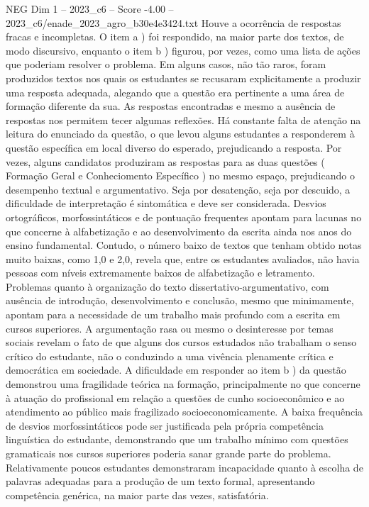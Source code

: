 \begin{textsample}{NEG Dim 1 – 2023\_c6 – Score -4.00 – 2023\_c6/enade\_2023\_agro\_b30e4e3424.txt}
Houve a ocorrência de respostas fracas e incompletas.
O item a ) foi respondido, na maior parte dos textos, de modo discursivo, enquanto o item b ) figurou, por vezes, como uma lista de ações que poderiam resolver o problema.
Em alguns casos, não tão raros, foram produzidos textos nos quais os estudantes se recusaram explicitamente a produzir uma resposta adequada, alegando que a questão era pertinente a uma área de formação diferente da sua.
As respostas encontradas e mesmo a ausência de respostas nos permitem tecer algumas reflexões.
Há constante falta de atenção na leitura do enunciado da questão, o que levou alguns estudantes a responderem à questão específica em local diverso do esperado, prejudicando a resposta.
Por vezes, alguns candidatos produziram as respostas para as duas questões ( Formação Geral e Conheciomento Específico ) no mesmo espaço, prejudicando o desempenho textual e argumentativo.
Seja por desatenção, seja por descuido, a dificuldade de interpretação é sintomática e deve ser considerada.
Desvios ortográficos, morfossintáticos e de pontuação frequentes apontam para lacunas no que concerne à alfabetização e ao desenvolvimento da escrita ainda nos anos do ensino fundamental.
Contudo, o número baixo de textos que tenham obtido notas muito baixas, como 1,0 e 2,0, revela que, entre os estudantes avaliados, não havia pessoas com níveis extremamente baixos de alfabetização e letramento.
Problemas quanto à organização do texto dissertativo-argumentativo, com ausência de introdução, desenvolvimento e conclusão, mesmo que minimamente, apontam para a necessidade de um trabalho mais profundo com a escrita em cursos superiores.
A argumentação rasa ou mesmo o desinteresse por temas sociais revelam o fato de que alguns dos cursos estudados não trabalham o senso crítico do estudante, não o conduzindo a uma vivência plenamente crítica e democrática em sociedade.
A dificuldade em responder ao item b ) da questão demonstrou uma fragilidade teórica na formação, principalmente no que concerne à atuação do profissional em relação a questões de cunho socioeconômico e ao atendimento ao público mais fragilizado socioeconomicamente.
A baixa frequência de desvios morfossintáticos pode ser justificada pela própria competência linguística do estudante, demonstrando que um trabalho mínimo com questões gramaticais nos cursos superiores poderia sanar grande parte do problema.
Relativamente poucos estudantes demonstraram incapacidade quanto à escolha de palavras adequadas para a produção de um texto formal, apresentando competência genérica, na maior parte das vezes, satisfatória.

\end{textsample}
